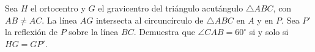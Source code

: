 Sea $H$ el ortocentro y $G$ el gravicentro del triángulo acutángulo $\bigtriangleup ABC$, con $AB \neq AC$.
La línea $AG$ intersecta al circuncírculo de $\bigtriangleup ABC$ en $A$ y en $P$. Sea $P'$ la reflexión de $P$ sobre la línea
$BC$. Demuestra que $\angle CAB = 60^{\circ}$ si y solo si $HG = GP'$.